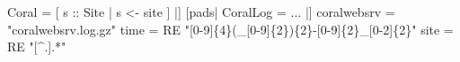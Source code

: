 \begin{code}
[forest|
  \kw{data} Log = \kw{Directory}
    \{ log is coralwebsrv :: Gzip (File CoralLog) \}
  \kw{type} Site  = [ d :: Log  | d <- \kw{matches} time ]
   Coral = [ s :: Site | s <-  site ]
|]
\mbox{}
[pads|
   CoralLog = ...
|]
\mbox{}
coralwebsrv = "coralwebsrv.log.gz"
time = RE "[0-9]\{4\}(_[0-9]\{2\})\{2\}-[0-9]\{2\}_[0-2]\{2\}"
site = RE "[^.].*"
\end{code}
